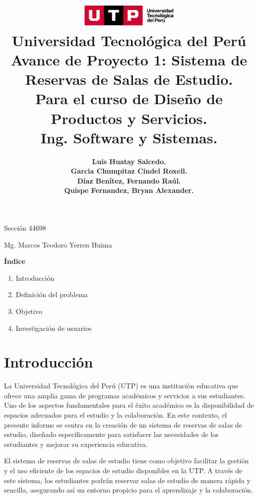 \documentclass{article}
\title{
  \includegraphics[width=5cm]{./assets/logo-utp.png} \\
  \vspace{1cm}
  \textbf{Universidad Tecnológica del Perú} \\
  \vspace{2cm}
  \textbf{Avance de Proyecto 1: Sistema de Reservas de Salas de Estudio.} \\
  \vspace{1cm}
  \large \textbf{Para el curso de Diseño de Productos y Servicios.} \\
  \large \textbf{Ing. Software y Sistemas.}
}
\author{
  \textbf{Luis Huatay Salcedo.} \\
  \textbf{Garcia Chumpitaz Cindel Roxell.} \\
  \textbf{Díaz Benítez, Fernando Raúl.} \\
  \textbf{Quispe Fernandez, Bryan Alexander.}
}
\begin{document}
\maketitle
\begin{center}
  Sección 44698
\end{center}
\thispagestyle{empty}
\begin{center}
  Mg. Marcos Teodoro Yerren Huima  
\end{center}
\restoregeometry

\newpage
\begin{center}
  \textbf{\Large Índice}
\end{center}
\vspace{0.5cm} %
\begin{spacing}{1.15} %
  \noindent
  \begin{enumerate}
    \item Introducción
    \item Definición del problema
    \item Objetivo
    \item Investigación de usuarios
    \end{enumerate}
\end{spacing}

\newpage
\vspace*{\fill}
\section{Introducción}
La Universidad Tecnológica del Perú (UTP) es una institución educativa que ofrece una amplia gama de programas académicos y servicios a sus estudiantes. Uno de los aspectos fundamentales para el éxito académico es la disponibilidad de espacios adecuados para el estudio y la colaboración. En este contexto, el presente informe se centra en la creación de un sistema de reservas de salas de estudio, diseñado específicamente para satisfacer las necesidades de los estudiantes y mejorar su experiencia educativa.

El sistema de reservas de salas de estudio tiene como objetivo facilitar la gestión y el uso eficiente de los espacios de estudio disponibles en la UTP. A través de este sistema, los estudiantes podrán reservar salas de estudio de manera rápida y sencilla, asegurando así un entorno propicio para el aprendizaje y la colaboración.
\vspace*{\fill}
\end{document}

